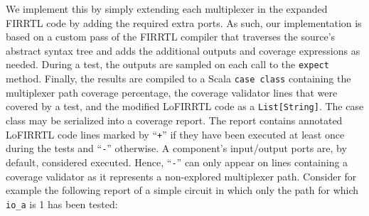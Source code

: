 \documentclass[conference]{IEEEtran}
\begin{document}
We implement this by simply extending each multiplexer in the expanded FIRRTL code by adding the required extra ports. %
As such, our implementation is based on a custom pass of the FIRRTL compiler that traverses the source's abstract syntax tree and adds the additional outputs and coverage expressions as needed. During a test, the outputs are sampled on each call to the \texttt{expect} method. Finally, the results are compiled to a Scala \texttt{case class} containing %
the multiplexer path coverage percentage, the coverage validator lines that were covered by a test, and the modified LoFIRRTL code as a \texttt{List[String]}.
The case class may be serialized into a coverage report. The report contains annotated LoFIRRTL code lines marked by ``\texttt{+}'' if they have been executed at least once during the tests and ``\texttt{-}'' otherwise. A component's input/output ports are, by default, considered executed. Hence, ``\texttt{-}'' can only appear on lines containing a coverage validator as it represents a non-explored multiplexer path. Consider for example the following report of a simple circuit in which only the path for which \texttt{io\_a} is 1 has been tested:
\end{document}
